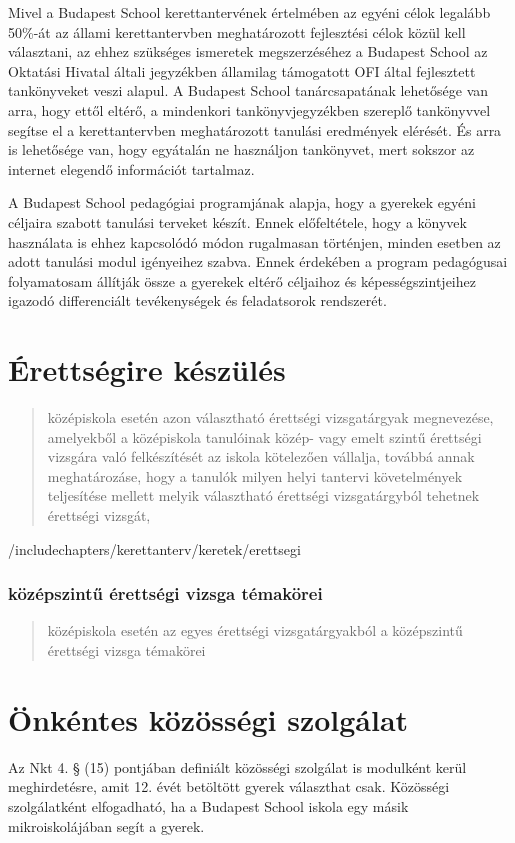 Mivel a Budapest School kerettantervének értelmében az egyéni célok
legalább 50\%-át az állami kerettantervben meghatározott fejlesztési
célok közül kell választani, az ehhez szükséges ismeretek megszerzéséhez
a Budapest School az Oktatási Hivatal általi jegyzékben államilag
támogatott OFI által fejlesztett tankönyveket veszi alapul. A Budapest
School tanárcsapatának lehetősége van arra, hogy ettől eltérő, a
mindenkori tankönyvjegyzékben szereplő tankönyvvel segítse el a
kerettantervben meghatározott tanulási eredmények elérését. És arra is
lehetősége van, hogy egyátalán ne használjon tankönyvet, mert sokszor az
internet elegendő információt tartalmaz.

A Budapest School pedagógiai programjának alapja, hogy a gyerekek egyéni
céljaira szabott tanulási terveket készít. Ennek előfeltétele, hogy a
könyvek használata is ehhez kapcsolódó módon rugalmasan történjen,
minden esetben az adott tanulási modul igényeihez szabva. Ennek
érdekében a program pedagógusai folyamatosam állítják össze a gyerekek
eltérő céljaihoz és képességszintjeihez igazodó differenciált
tevékenységek és feladatsorok rendszerét.

\section{Érettségire készülés }

\begin{quote}
      középiskola esetén azon választható érettségi vizsgatárgyak megnevezése,
      amelyekből a középiskola tanulóinak közép- vagy emelt szintű érettségi
      vizsgára való felkészítését az iskola kötelezően vállalja, továbbá annak
      meghatározáse, hogy a tanulók milyen helyi tantervi követelmények
      teljesítése mellett melyik választható érettségi vizsgatárgyból tehetnek
      érettségi vizsgát,
\end{quote}

/include{chapters/kerettanterv/keretek/erettsegi}

\subsubsection{középszintű érettségi vizsga témakörei}

\begin{quote}
      középiskola esetén az egyes érettségi vizsgatárgyakból a középszintű
      érettségi vizsga témakörei
\end{quote}


\section{Önkéntes közösségi
  szolgálat}\label{uxf6nkuxe9ntes-kuxf6zuxf6ssuxe9gi-szolguxe1lat}

Az Nkt 4. § (15) pontjában definiált közösségi szolgálat is modulként
kerül meghirdetésre, amit 12. évét betöltött gyerek választhat csak.
Közösségi szolgálatként elfogadható, ha a Budapest School iskola egy
másik mikroiskolájában segít a gyerek.
